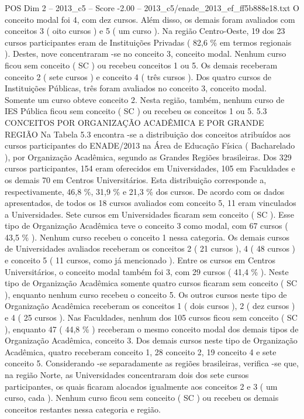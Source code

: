 \begin{textsample}{POS Dim 2 – 2013\_c5 – Score -2.00 – 2013\_c5/enade\_2013\_ef\_ff5b888e18.txt}
O conceito modal foi 4, com dez cursos.
Além disso, os demais foram avaliados com conceitos 3 ( oito cursos ) e 5 ( um curso ).
Na região Centro-Oeste, 19 dos 23 cursos participantes eram de Instituições Privadas ( 82,6 \% em termos regionais ).
Destes, nove concentraram -se no conceito 3, conceito modal.
Nenhum curso ficou sem conceito ( SC ) ou recebeu conceitos 1 ou 5.
Os demais receberam conceito 2 ( sete cursos ) e conceito 4 ( três cursos ).
Dos quatro cursos de Instituições Públicas, três foram avaliados no conceito 3, conceito modal.
Somente um curso obteve conceito 2.
Nesta região, também, nenhum curso de IES Pública ficou sem conceito ( SC ) ou recebeu os conceitos 1 ou 5. 5.3 CONCEITOS POR ORGANIZAÇÃO ACADÊMICA E POR GRANDE REGIÃO Na Tabela 5.3 encontra -se a distribuição dos conceitos atribuídos aos cursos participantes do ENADE/2013 na Área de Educação Física ( Bacharelado ), por Organização Acadêmica, segundo as Grandes Regiões brasileiras.
Dos 329 cursos participantes, 154 eram oferecidos em Universidades, 105 em Faculdades e os demais 70 em Centros Universitários.
Esta distribuição corresponde a, respectivamente, 46,8 \%, 31,9 \% e 21,3 \% dos cursos.
De acordo com os dados apresentados, de todos os 18 cursos avaliados com conceito 5, 11 eram vinculados a Universidades.
Sete cursos em Universidades ficaram sem conceito ( SC ).
Esse tipo de Organização Acadêmica teve o conceito 3 como modal, com 67 cursos ( 43,5 \% ).
Nenhum curso recebeu o conceito 1 nessa categoria.
Os demais cursos de Universidades avaliados receberam os conceitos 2 ( 21 cursos ), 4 ( 48 cursos ) e conceito 5 ( 11 cursos, como já mencionado ).
Entre os cursos em Centros Universitários, o conceito modal também foi 3, com 29 cursos ( 41,4 \% ).
Neste tipo de Organização Acadêmica somente quatro cursos ficaram sem conceito ( SC ), enquanto nenhum curso recebeu o conceito 5.
Os outros cursos neste tipo de Organização Acadêmica receberam os conceitos 1 ( dois cursos ), 2 ( dez cursos ) e 4 ( 25 cursos ).
Nas Faculdades, nenhum dos 105 cursos ficou sem conceito ( SC ), enquanto 47 ( 44,8 \% ) receberam o mesmo conceito modal dos demais tipos de Organização Acadêmica, conceito 3.
Dos demais cursos neste tipo de Organização Acadêmica, quatro receberam conceito 1, 28 conceito 2, 19 conceito 4 e sete conceito 5.
Considerando -se separadamente as regiões brasileiras, verifica -se que, na região Norte, as Universidades concentraram dois dos sete cursos participantes, os quais ficaram alocados igualmente aos conceitos 2 e 3 ( um curso, cada ).
Nenhum curso ficou sem conceito ( SC ) ou recebeu os demais conceitos restantes nessa categoria e região.

\end{textsample}
